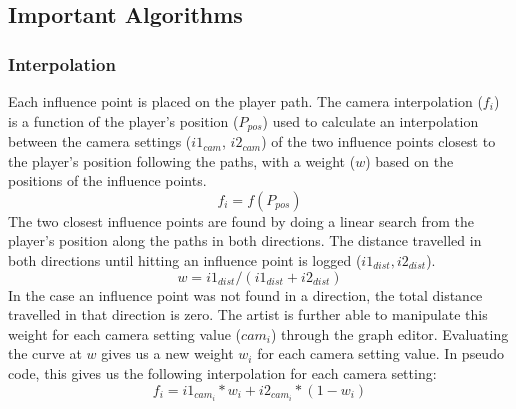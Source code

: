 \subsection{Important Algorithms}
\subsubsection{Interpolation} \label{interpolationChapter}
Each influence point is placed on the player path. The camera interpolation ($f_{i}$) is a function of the player's position ($P_{pos}$) used to calculate an interpolation between the camera settings ($i1_{cam}$, $i2_{cam}$) of the two influence points closest to the player's position following the paths, with a weight ($w$) based on the positions of the influence points.
\begin{equation}
f_{i} = f(P_{pos})
\end{equation}
The two closest influence points are found by doing a linear search from the player's position along the paths in both directions. The distance travelled in both directions until hitting an influence point is logged ($i1_{dist}, i2_{dist}$).
\begin{equation}
w = i1_{dist}/(i1_{dist} + i2_{dist})
\end{equation}
In the case an influence point was not found in a direction, the total distance travelled in that direction is zero. The artist is further able to manipulate this weight for each camera setting value ($cam_{i}$) through the graph editor. Evaluating the curve at $w$ gives us a new weight $w_{i}$ for each camera setting value. In pseudo code, this gives us the following interpolation for each camera setting:
\begin{equation}
f_{i} = i1_{cam_{i}} * w_{i} + i2_{cam_{i}} * (1-w_{i})
\end{equation}

